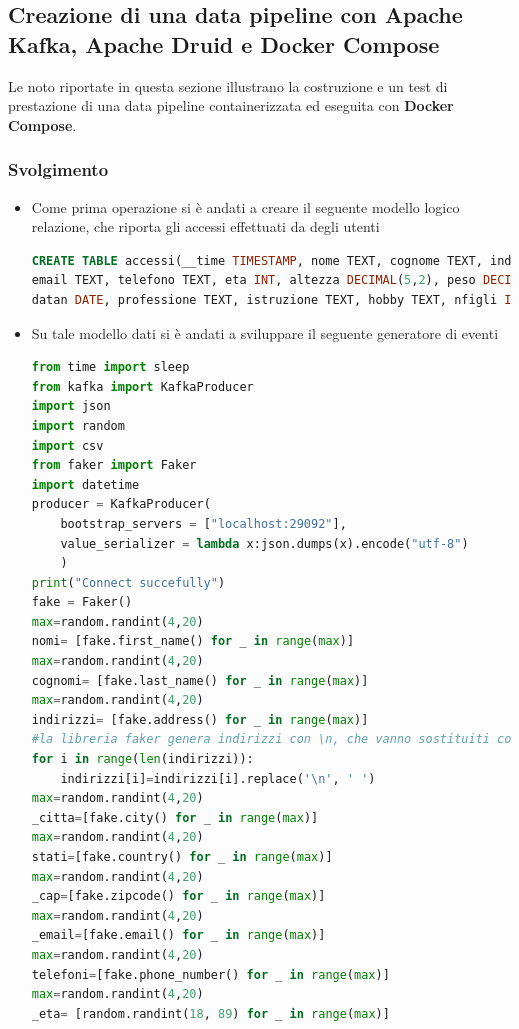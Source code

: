 \documentclass{article}
\begin{document}
\subsection{Creazione di una data pipeline con Apache Kafka, Apache Druid e Docker Compose}
Le noto riportate in questa sezione illustrano la costruzione e un test di prestazione di una data pipeline containerizzata ed eseguita con \textbf{Docker Compose}.
\subsubsection{Svolgimento}
\begin{itemize}
    \item Come prima operazione si è andati a creare il seguente modello logico relazione, che riporta gli accessi effettuati da degli utenti
    \begin{lstlisting}[language=SQL]
CREATE TABLE accessi(__time TIMESTAMP, nome TEXT, cognome TEXT, indirizzo TEXT, citta TEXT, stato TEXT, cap INT, 
email TEXT, telefono TEXT, eta INT, altezza DECIMAL(5,2), peso DECIMAL(5,2), reddito DECIMAL(6,2), 
datan DATE, professione TEXT, istruzione TEXT, hobby TEXT, nfigli INT, codice_cliente INT, datareg TIMESTAMP);
    \end{lstlisting}
\item Su tale modello dati si è andati a sviluppare il seguente generatore di eventi
\begin{lstlisting}[language=Python]
from time import sleep  
from kafka import KafkaProducer  
import json 
import random
import csv
from faker import Faker
import datetime
producer = KafkaProducer(  
    bootstrap_servers = ["localhost:29092"],  
    value_serializer = lambda x:json.dumps(x).encode("utf-8")  
    )  
print("Connect succefully") 
fake = Faker()
max=random.randint(4,20)
nomi= [fake.first_name() for _ in range(max)]
max=random.randint(4,20)
cognomi= [fake.last_name() for _ in range(max)]
max=random.randint(4,20)
indirizzi= [fake.address() for _ in range(max)]
#la libreria faker genera indirizzi con \n, che vanno sostituiti con uno spazio
for i in range(len(indirizzi)):
    indirizzi[i]=indirizzi[i].replace('\n', ' ')
max=random.randint(4,20)
_citta=[fake.city() for _ in range(max)]
max=random.randint(4,20)
stati=[fake.country() for _ in range(max)]
max=random.randint(4,20)
_cap=[fake.zipcode() for _ in range(max)]
max=random.randint(4,20)
_email=[fake.email() for _ in range(max)]
max=random.randint(4,20)
telefoni=[fake.phone_number() for _ in range(max)]
max=random.randint(4,20)
_eta= [random.randint(18, 89) for _ in range(max)]

\end{lstlisting}
\end{itemize}
\end{document}
